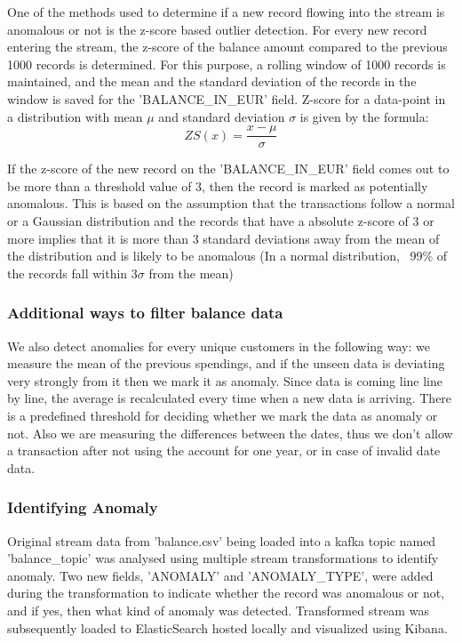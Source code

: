 \documentclass{article}
\begin{document}
One of the methods used to determine if a new record flowing into the stream is anomalous or not is the z-score based outlier detection. For every new record entering the stream, the z-score of the balance amount compared to the previous 1000 records is determined. For this purpose, a rolling window of 1000 records is maintained, and the mean and the standard deviation of the records in the window is saved for the 'BALANCE\_IN\_EUR' field. 
Z-score for a data-point in a distribution with mean $\mu$ and standard deviation $\sigma$ is given by the formula:
\begin{equation}
    ZS(x) = \frac{x-\mu}{\sigma}
\end{equation}

If the z-score of the new record on the 'BALANCE\_IN\_EUR' field comes out to be more than a threshold value of 3, then the record is marked as potentially anomalous. This is based on the assumption that the transactions follow a normal or a Gaussian distribution and the records that have a absolute z-score of 3 or more implies that it is more than 3 standard deviations away from the mean of the distribution and is likely to be anomalous (In a normal distribution, ~99\% of the records fall within 3$\sigma$ from the mean)

\subsubsection{Additional ways to filter balance data}

We also detect anomalies for every unique customers in the following way: we measure the mean of the previous spendings, and if the unseen data is deviating very strongly from it then we mark it as anomaly. Since data is coming line line by line, the average is recalculated every time when a new data is arriving. There is a predefined threshold for deciding whether we mark the data as anomaly or not. Also we are measuring the differences between the dates, thus we don't allow a transaction after not using the account for one year, or in case of invalid date data.

\subsubsection{Identifying Anomaly}

Original stream data from 'balance.csv' being loaded into a kafka topic named 'balance\_topic' was analysed using multiple stream transformations to identify anomaly. Two new fields, 'ANOMALY' and 'ANOMALY\_TYPE', were added during the transformation to indicate whether the record was anomalous or not, and if yes, then what kind of anomaly was detected. Transformed stream was subsequently loaded to ElasticSearch hosted locally and visualized using Kibana.
\end{document}
